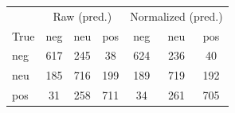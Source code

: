 \begin{tabular}{l|ccc|ccc}
\toprule
 & \multicolumn{3}{c|}{Raw (pred.)} & \multicolumn{3}{c}{Normalized (pred.)}\\
True & neg & neu & pos & neg & neu & pos\\
\midrule
neg & 617 & 245 & 38 & 624 & 236 & 40\\
neu & 185 & 716 & 199 & 189 & 719 & 192\\
pos & 31 & 258 & 711 & 34 & 261 & 705\\
\bottomrule
\end{tabular}

